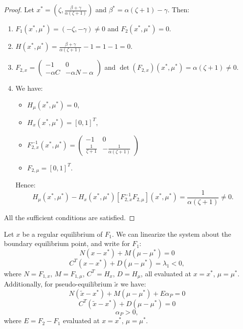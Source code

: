 \documentclass[12pt,a4paper]{article}
\begin{document}
\begin{proof}
    Let $x^*=\left(\zeta, \frac{\beta + \gamma}{\alpha (\zeta + 1)}\right)$ and $\beta^*=\alpha(\zeta+1) - \gamma$. 
    Then:
    \begin{enumerate}
        \item $F_1(x^*, \mu^*) = \left(-\zeta, -\gamma\right) \neq 0 $ and $F_2(x^*, \mu^*)= 0.$
        \item $H(x^*, \mu^*)=\frac{\beta +\gamma}{\alpha (\zeta + 1)} - 1 = 1-1 = 0.$
        \item $F_{2,x} = \begin{pmatrix}
        -1 & 0 \\
        -\alpha C & -\alpha N - \alpha
        \end{pmatrix}$ and $\det(F_{2,x})(x^*, \mu^*) = \alpha (\zeta + 1) \neq 0.$
    \item We have: 
    \begin{itemize}
        \item $H_{\mu}(x^*, \mu^*) = 0$,
        \item $H_x(x^*, \mu^*) = [0, 1]^T$,
        \item $F_{2, x}^{-1}(x^*, \mu^*) = \begin{pmatrix}
        -1 & 0 \\
        \frac{1}{\zeta + 1} & -\frac{1}{\alpha(\zeta + 1)}
        \end{pmatrix}$
        \item $F_{2, \mu} = [0, 1]^T.$
    \end{itemize}
    Hence:
    \begin{equation}
        H_{\mu}(x^*,\mu^*) - H_x(x^*,\mu^*)[F_{2,x}^{-1} F_{2, \mu}](x^*,\mu^*) = \frac{1}{\alpha(\zeta + 1)} \neq 0.
    \end{equation}
    \end{enumerate}
    All the sufficient conditions are satisfied.
\end{proof}
Let $x$ be a regular equilibrium of $F_1$. We can linearize the system about the boundary equilibrium point, and write for $F_1$:
\begin{equation}
    N(x-x^*) + M(\mu-\mu^*) = 0
\end{equation}
\begin{equation}
    C^T(x-x^*) + D(\mu-\mu^*) = \lambda_1 <0,
\end{equation}
where $N=F_{1, x}$, $M=F_{1, \mu}$, $C^T=H_x$, $D=H_{\mu}$, all evaluated at $x=x^*$, $\mu=\mu^*$. 
Additionally, for pseudo-equilibrium $\tilde{x}$ we have:
\begin{equation}
    N(\tilde{x}-x^*) + M(\mu-\mu^*)+E\alpha_{P} = 0
\end{equation}
\begin{equation}
    C^T(\tilde{x}-x^*)+D(\mu-\mu^*)=0
\end{equation}
\begin{equation}
    \alpha_P > 0,
\end{equation}
where $E=F_2-F_1$ evaluated at $x=x^*$, $\mu=\mu^*$.
\end{document}
